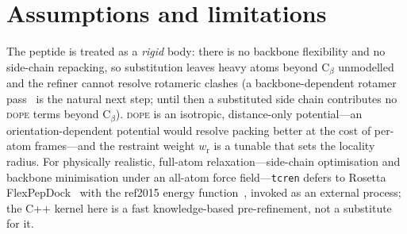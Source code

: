 \documentclass[11pt]{article}
\theoremstyle{oldplain}
\theoremstyle{oldrem}
\begin{document}
\section{Assumptions and limitations}\label{sec:limits}
The peptide is treated as a \emph{rigid} body: there is no backbone flexibility and no side-chain
repacking, so substitution leaves heavy atoms beyond $\mathrm C_\beta$ unmodelled and the refiner
cannot resolve rotameric clashes (a backbone-dependent rotamer pass~\cite{Shapovalov2011} is the
natural next step; until then a substituted side chain contributes no \textsc{dope} terms beyond
$\mathrm C_\beta$). \textsc{dope} is an isotropic, distance-only potential---an orientation-dependent
potential would resolve packing better at the cost of per-atom frames---and the restraint weight
$w_{\mathrm r}$ is a tunable that sets the locality radius. For physically realistic, full-atom
relaxation---side-chain optimisation and backbone minimisation under an all-atom force
field---\texttt{tcren} defers to Rosetta FlexPepDock~\cite{Raveh2010,London2011} with the ref2015
energy function~\cite{Alford2017}, invoked as an external process; the C++ kernel here is a fast
knowledge-based pre-refinement, not a substitute for it.



\end{document}
